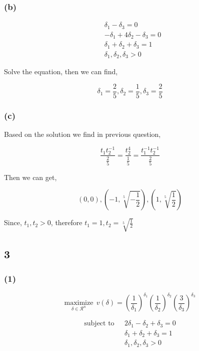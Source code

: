 \documentclass{article}
\begin{document}
\subsubsection*{(b)}


\[
\begin{split}
& \delta_1 - \delta_3 = 0 \\ 
& -\delta_1 + 4\delta_2 - \delta_3 = 0 \\ 
& \delta_1 + \delta_2 + \delta_3 = 1 \\
& \delta_1, \delta_2, \delta_3 > 0
\end{split}
\]


Solve the equation, then we can find,

$$\delta_1 = \frac{2}{5}, \delta_2 = \frac{1}{5}, \delta_3 = \frac{2}{5}$$

\subsubsection*{(c)}

Based on the solution we find in previous question,

$$\frac{t_1t_2^{-1}}{\frac{2}{5}}=\frac{t_2^4}{\frac{1}{5}}=\frac{t_1^{-1}t_2^{-1}}{\frac{2}{5}}$$

Then we can get,

$$(0, 0), (-1, \sqrt[5]{-\frac{1}{2}}), (1, \sqrt[5]{\frac{1}{2}})$$

Since, $t_1, t_2 > 0$, therefore $t_1 = 1, t_2=\sqrt[5]{\frac{1}{2}}$

\subsection*{3}

\subsubsection*{(1)}

$$\underset{\delta \in \mathcal{R}^n}{\text{maximize}} \ \  v(\delta) = \left(\frac{1}{\delta_1}\right)^{\delta_1}\left(\frac{1}{\delta_2}\right)^{\delta_2}\left(\frac{3}{\delta_3}\right)^{\delta_3}$$

\[
\begin{split}
\text{subject to}\ \ \ & 2\delta_1 - \delta_2 + \delta_3 = 0 \\ 
& \delta_1 + \delta_2 + \delta_3 = 1 \\
& \delta_1, \delta_2, \delta_3 > 0
\end{split}
\]
\end{document}
